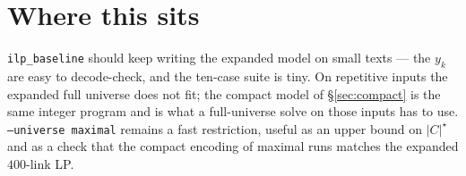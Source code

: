 \documentclass[11pt,a4paper]{article}
\theoremstyle{definition}
\theoremstyle{plain}
\theoremstyle{remark}
\begin{document}
\section{Where this sits}
\label{sec:where}

\texttt{ilp\_baseline} should keep writing the expanded model on small
texts --- the $y_k$ are easy to decode-check, and the ten-case suite is
tiny. On repetitive inputs the expanded full universe does not fit;
the compact model of \S\ref{sec:compact} is the same integer program
and is what a full-universe solve on those inputs has to use.
\texttt{--universe maximal} remains a fast restriction, useful as an
upper bound on $|C|^\star$ and as a check that the compact encoding of
maximal runs matches the expanded $400$-link LP.
\end{document}
